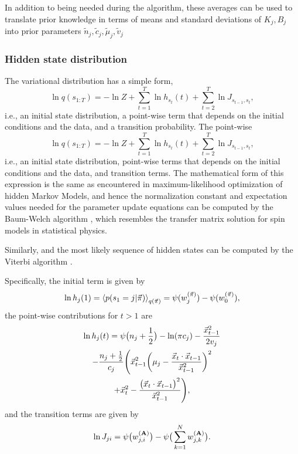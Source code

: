 In addition to being needed during the algorithm, these averages can
be used to translate prior knowledge in terms of means and standard
deviations of $K_j,B_j$ into prior parameters $\tilde n_j, \tilde c_j,
\tilde \mu_j, \tilde v_j$

\subsubsection{Hidden state distribution}
The variational distribution has a simple form,
\begin{equation}\label{seq:qgt}
  \ln q(s_{1:T})=-\ln Z+\sum_{t=1}^T\ln h_{s_t}(t)+\sum_{t=2}^T\ln J_{s_{t-1},s_t},
\end{equation}
i.e., an initial state distribution, a point-wise term that depends on
the initial conditions and the data, and a transition
probability. The point-wise 
\begin{equation}
  \ln q(s_{1:T})=-\ln Z+\sum_{t=1}^T\ln h_{s_t}(t)+\sum_{t=2}^T\ln J_{s_{t-1},s_t},
\end{equation}
i.e., an initial state distribution, point-wise terms that depends on
the initial conditions and the data, and transition terms. The
mathematical form of this expression is the same as encountered in
maximum-likelihood optimization of hidden Markov Models, and hence the
normalization constant and expectation values needed for the parameter
update equations can be computed by the Baum-Welch algorithm
\cite{baum1970}, which resembles the transfer matrix solution for spin
models in statistical physics. 

Similarly, and the most likely sequence of hidden states can be
computed by the Viterbi algorithm \cite{viterbi1967}.

Specifically, the initial term is given by
\begin{equation}
  \ln h_j(1)=
  \left\langle p(s_1=j|\vec{\pi})\right\rangle_{q(\vec{\pi})}
  =\psi(w_{j}^{(\vec{\pi})})-\psi(w_0^{(\vec{\pi})}),
\end{equation}
the point-wise contributions for $t>1$ are
\begin{multline}
  \ln h_j(t)=
  \psi\big(n_j+\frac12\big)-\ln(\pi c_j)-\frac{\vec{x}_{t-1}^2}{2v_j}\\
-\frac{n_j+\frac12}{c_j}\Bigg(
\vec{x}_{t-1}^2\bigg(\mu_j-\frac{\vec{x}_t\cdot\vec{x}_{t-1}}{\vec{x}_{t-1}^2}\bigg)^2\\
+\vec{x}_t^2-\frac{\big(\vec{x}_t\cdot\vec{x}_{t-1}\big)^2}{\vec{x}_{t-1}^2}\Bigg),
\end{multline}
and the transition terms are given by
\begin{equation}
    \ln J_{ji}=\psi\big(w_{j,i}^{(\mathbf{A})}\big)
    -\psi\big(\sum_{k=1}^Nw_{j,k}^{(\mathbf{A})}\big).
\end{equation}
